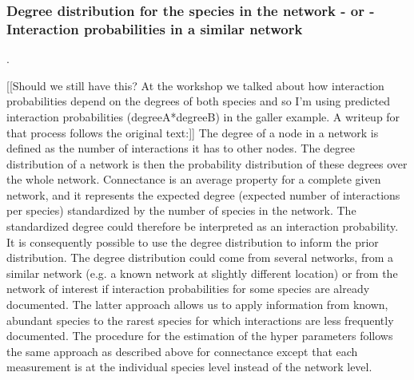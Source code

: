\documentclass[12pt]{article}
\begin{document}


      \subsubsection*{Degree distribution for the species in the network - or - Interaction probabilities in a similar network}.

          [[Should we still have this? At the workshop we talked about how interaction probabilities depend on the degrees of both species and so I'm using predicted interaction probabilities (degreeA*degreeB) in the galler example. A writeup for that process follows the original text:]]
          The degree of a node in a network is defined as the number of interactions it has to other nodes. The degree distribution of a network is then the probability distribution of these degrees over the whole network. Connectance is an average property for a complete given network, and it represents the expected degree (expected number of interactions per species) standardized by the number of species in the network. The standardized degree could therefore be interpreted as an interaction probability. It is consequently possible to use the degree distribution to inform the prior distribution. The degree distribution could come from several networks, from a similar network (e.g. a known network at slightly different location) or from the network of interest if interaction probabilities for some species are already documented. The latter approach allows us to apply information from known, abundant species to the rarest species for which interactions are less frequently documented. The procedure for the estimation of the hyper parameters follows the same approach as described above for connectance except that each measurement is at the individual species level instead of the network level.
\end{document}
